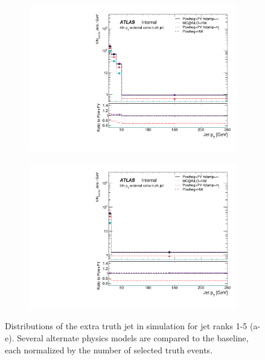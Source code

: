 \begin{figure}
\begin{subfigure}[]{0.33\textwidth}
\end{subfigure}
\begin{subfigure}[]{0.33\textwidth}
\includegraphics[width=\textwidth]{fig/MCComp/TruthPtJet3.pdf}
\end{subfigure}
\begin{subfigure}[]{0.33\textwidth}
\includegraphics[width=\textwidth]{fig/MCComp/TruthPtJet4.pdf}
\end{subfigure}
\caption{Distributions of the extra truth jet \pt in \ttbar simulation for jet ranks 1-5 (a-e). Several alternate physics models are compared to the baseline, each normalized by the number of selected truth events.}
\label{fig:truthjetpt}
\end{figure}
